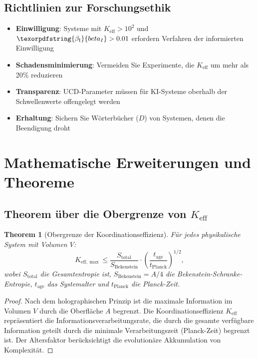 \documentclass[12pt,a4paper]{article}
\newtheorem{theorem}{Theorem}
\DeclareRobustCommand{\beI}{\texorpdfstring{\ensuremath{\beta_{\mathrm{I}}}}{beta_I}}
\newcommand{\eff}{\mathrm{eff}}
\newcommand{\Ke}{K_{\eff}}
\newcommand{\Kemax}{K_{\eff,\max}}
\begin{document}
	\subsection{Richtlinien zur Forschungsethik}
	
	\begin{itemize}
		\item \textbf{Einwilligung}: Systeme mit \(\Ke > 10^2\) und \(\beI > 0.01\) erfordern Verfahren der informierten Einwilligung
		\item \textbf{Schadensminimierung}: Vermeiden Sie Experimente, die \(\Ke\) um mehr als 20\% reduzieren
		\item \textbf{Transparenz}: UCD-Parameter müssen für KI-Systeme oberhalb der Schwellenwerte offengelegt werden
		\item \textbf{Erhaltung}: Sichern Sie Wörterbücher (\(D\)) von Systemen, denen die Beendigung droht
	\end{itemize}
	
	\section{Mathematische Erweiterungen und Theoreme}
	
	\subsection{Theorem über die Obergrenze von \(\Ke\)}
	
	\begin{theorem}[Obergrenze der Koordinationseffizienz]
		Für jedes physikalische System mit Volumen \(V\):
		\[
		\Kemax \leq \frac{S_{\mathrm{total}}}{S_{\mathrm{Bekenstein}}} \cdot \left(\frac{t_{\mathrm{age}}}{t_{\mathrm{Planck}}}\right)^{1/2},
		\]
		wobei \(S_{\mathrm{total}}\) die Gesamtentropie ist, \(S_{\mathrm{Bekenstein}} = A/4\) die Bekenstein-Schranke-Entropie, \(t_{\mathrm{age}}\) das Systemalter und \(t_{\mathrm{Planck}}\) die Planck-Zeit.
	\end{theorem}
	
	\begin{proof}
		Nach dem holographischen Prinzip ist die maximale Information im Volumen \(V\) durch die Oberfläche \(A\) begrenzt. Die Koordinationseffizienz \(\Ke\) repräsentiert die Informationsverarbeitungsrate, die durch die gesamte verfügbare Information geteilt durch die minimale Verarbeitungszeit (Planck-Zeit) begrenzt ist. Der Altersfaktor berücksichtigt die evolutionäre Akkumulation von Komplexität.
	\end{proof}
	
\end{document}
